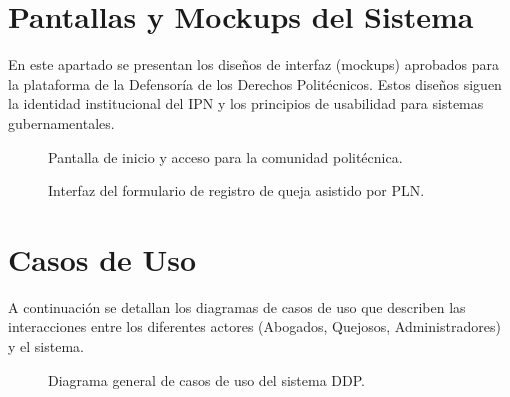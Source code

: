 
\begin{appendices}

\chapter{Pantallas y Mockups del Sistema}
\label{anexo:pantallas}

En este apartado se presentan los diseños de interfaz (mockups) aprobados para la plataforma de la Defensoría de los Derechos Politécnicos. Estos diseños siguen la identidad institucional del IPN y los principios de usabilidad para sistemas gubernamentales.

\begin{figure}[htbp]
    \centering
    \caption{Pantalla de inicio y acceso para la comunidad politécnica.}
    \label{fig:mockup1}
\end{figure}

\begin{figure}[htbp]
    \centering
    \caption{Interfaz del formulario de registro de queja asistido por PLN.}
    \label{fig:mockup2}
\end{figure}

\newpage

\chapter{Casos de Uso}
\label{anexo:casos_uso}

A continuación se detallan los diagramas de casos de uso que describen las interacciones entre los diferentes actores (Abogados, Quejosos, Administradores) y el sistema.

\begin{figure}[htbp]
    \centering
    \caption{Diagrama general de casos de uso del sistema DDP.}
    \label{fig:casos_uso_general}
\end{figure}


\end{appendices}